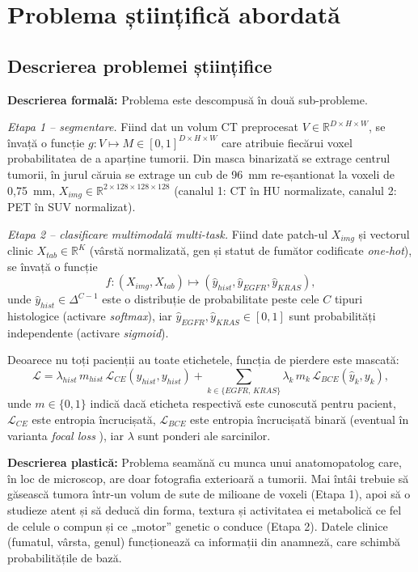 \documentclass[11pt, a4paper]{article}
\begin{document}
\section{Problema științifică abordată}

\subsection{Descrierea problemei științifice}
\textbf{Descrierea formală:} Problema este descompusă în două sub-probleme.

\textit{Etapa 1 -- segmentare.} Fiind dat un volum CT preprocesat $V \in \mathbb{R}^{D \times H \times W}$, se învață o funcție $g: V \mapsto M \in [0,1]^{D \times H \times W}$ care atribuie fiecărui voxel probabilitatea de a aparține tumorii. Din masca binarizată se extrage centrul tumorii, în jurul căruia se extrage un cub de 96~mm re-eșantionat la voxeli de 0,75~mm, $X_{img} \in \mathbb{R}^{2 \times 128 \times 128 \times 128}$ (canalul 1: CT în HU normalizate, canalul 2: PET în SUV normalizat).

\textit{Etapa 2 -- clasificare multimodală multi-task.} Fiind date patch-ul $X_{img}$ și vectorul clinic $X_{tab} \in \mathbb{R}^{K}$ (vârstă normalizată, gen și statut de fumător codificate \textit{one-hot}), se învață o funcție
\[
f: (X_{img}, X_{tab}) \mapsto \left( \hat{y}_{hist}, \hat{y}_{EGFR}, \hat{y}_{KRAS} \right),
\]
unde $\hat{y}_{hist} \in \Delta^{C-1}$ este o distribuție de probabilitate peste cele $C$ tipuri histologice (activare \textit{softmax}), iar $\hat{y}_{EGFR}, \hat{y}_{KRAS} \in [0,1]$ sunt probabilități independente (activare \textit{sigmoid}).

Deoarece nu toți pacienții au toate etichetele, funcția de pierdere este mascată:
\[
\mathcal{L} = \lambda_{hist}\, m_{hist}\, \mathcal{L}_{CE}(\hat{y}_{hist}, y_{hist}) + \sum_{k \in \{EGFR,\, KRAS\}} \lambda_k\, m_k\, \mathcal{L}_{BCE}(\hat{y}_k, y_k),
\]
unde $m \in \{0,1\}$ indică dacă eticheta respectivă este cunoscută pentru pacient, $\mathcal{L}_{CE}$ este entropia încrucișată, $\mathcal{L}_{BCE}$ este entropia încrucișată binară (eventual în varianta \textit{focal loss} \cite{lin2017}), iar $\lambda$ sunt ponderi ale sarcinilor.

\textbf{Descrierea plastică:} Problema seamănă cu munca unui anatomopatolog care, în loc de microscop, are doar fotografia exterioară a tumorii. Mai întâi trebuie să găsească tumora într-un volum de sute de milioane de voxeli (Etapa 1), apoi să o studieze atent și să deducă din forma, textura și activitatea ei metabolică ce fel de celule o compun și ce „motor'' genetic o conduce (Etapa 2). Datele clinice (fumatul, vârsta, genul) funcționează ca informații din anamneză, care schimbă probabilitățile de bază.
\end{document}
